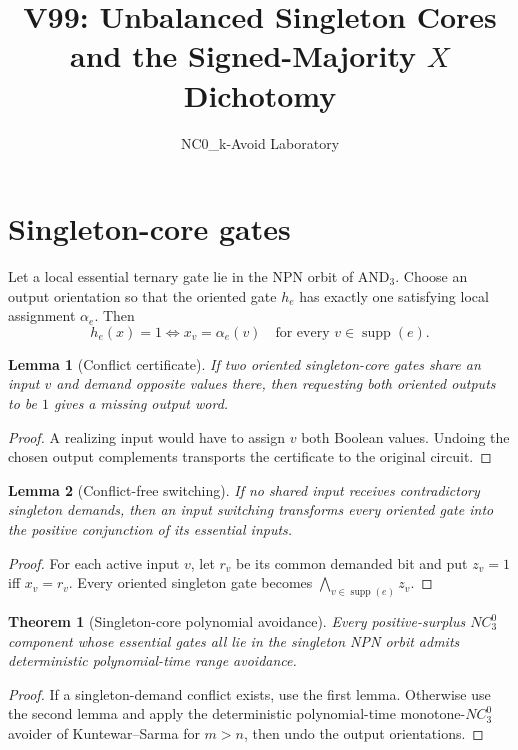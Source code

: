 \documentclass[11pt]{article}
\title{V99: Unbalanced Singleton Cores and the Signed-Majority $X$ Dichotomy}
\author{NC0\_k-Avoid Laboratory}
\date{}
\newtheorem{theorem}{Theorem}
\newtheorem{lemma}{Lemma}
\begin{document}
\maketitle

\section{Singleton-core gates}
Let a local essential ternary gate lie in the NPN orbit of $\mathrm{AND}_3$.
Choose an output orientation so that the oriented gate $h_e$ has exactly one
satisfying local assignment $\alpha_e$. Then
\[
 h_e(x)=1 \iff x_v=\alpha_e(v)\quad\text{for every }v\in\operatorname{supp}(e).
\]

\begin{lemma}[Conflict certificate]
If two oriented singleton-core gates share an input $v$ and demand opposite
values there, then requesting both oriented outputs to be $1$ gives a missing
output word.
\end{lemma}
\begin{proof}
A realizing input would have to assign $v$ both Boolean values. Undoing the
chosen output complements transports the certificate to the original circuit.
\end{proof}

\begin{lemma}[Conflict-free switching]
If no shared input receives contradictory singleton demands, then an input
switching transforms every oriented gate into the positive conjunction of its
essential inputs.
\end{lemma}
\begin{proof}
For each active input $v$, let $r_v$ be its common demanded bit and put
$z_v=1$ iff $x_v=r_v$. Every oriented singleton gate becomes
$\bigwedge_{v\in\operatorname{supp}(e)} z_v$.
\end{proof}

\begin{theorem}[Singleton-core polynomial avoidance]
Every positive-surplus $NC^0_3$ component whose essential gates all lie in the
singleton NPN orbit admits deterministic polynomial-time range avoidance.
\end{theorem}
\begin{proof}
If a singleton-demand conflict exists, use the first lemma. Otherwise use the
second lemma and apply the deterministic polynomial-time monotone-$NC^0_3$
avoider of Kuntewar--Sarma for $m>n$, then undo the output orientations.
\end{proof}
\end{document}
